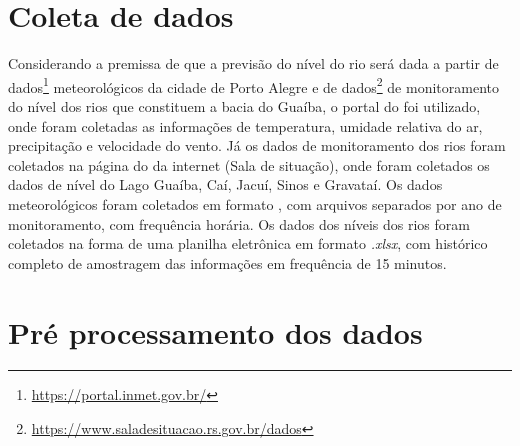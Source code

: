 


\section{Coleta de dados}
\label{sec:coleta_dados}

Considerando a premissa de que a previsão do nível do rio será dada a partir de dados\footnote{\url{https://portal.inmet.gov.br/}} meteorológicos da cidade de Porto Alegre e de dados\footnote{\url{https://www.saladesituacao.rs.gov.br/dados}} de monitoramento do nível dos rios que constituem a bacia do Guaíba, o portal do  foi utilizado, onde foram coletadas as informações de temperatura, umidade relativa do ar, precipitação e velocidade do vento. Já os dados de monitoramento dos rios foram coletados na página do  da internet (Sala de situação), onde foram coletados os dados de nível do Lago Guaíba, Caí, Jacuí, Sinos e Gravataí. Os dados meteorológicos foram coletados em formato , com arquivos separados por ano de monitoramento, com frequência horária. Os dados dos níveis dos rios foram coletados na forma de uma planilha eletrônica em formato \textit{.xlsx}, com histórico completo de amostragem das informações em frequência de 15 minutos.

\section{Pré processamento dos dados}
\label{sec:pre_processamento_dos_dados}

